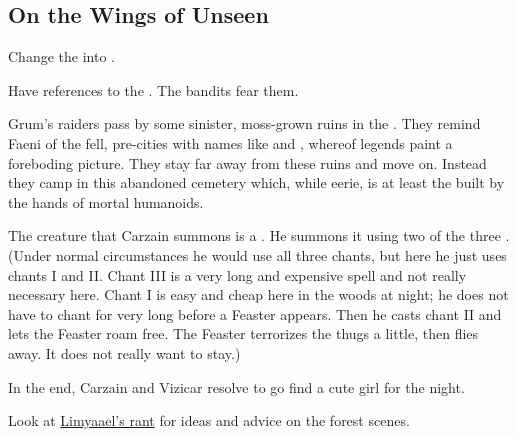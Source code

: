 \subsection{On the Wings of \Dragons Unseen}
\begin{changes}

  \begin{comment}
  \paragraph{Screaming in the Dark}
  \end{comment}
    Change the \scathae into \humans.
    
    Have references to the . 
    The bandits fear them.
    
    Grum's raiders pass by some sinister, moss-grown ruins in the \wylde.
    They remind Faeni of the fell, pre-\human cities with names like  and , whereof legends paint a foreboding picture. 
    They stay far away from these ruins and move on.
    Instead they camp in this abandoned cemetery which, while eerie, is at least the built by the hands of mortal humanoids. 
    
    The creature that Carzain summons is a . 
    He summons it using two of the three . 
    (Under normal circumstances he would use all three chants, but here he just uses chants I and II. 
    Chant III is a very long and expensive spell and not really necessary here.
    Chant I is easy and cheap here in the woods at night; he does not have to chant for very long before a Feaster appears.
    Then he casts chant II and lets the Feaster roam free.
    The Feaster terrorizes the thugs a little, then flies away.
    It does not really want to stay.)
    
    In the end, Carzain and Vizicar resolve to go find a cute girl for the night. 
  
  \begin{comment}\paragraph{The Mystery of \EreshKal}\end{comment}
    Look at \href{http://limyaael.livejournal.com/167123.html}{Limyaael's  rant} for ideas and advice on the forest scenes. 
    

\end{changes}

